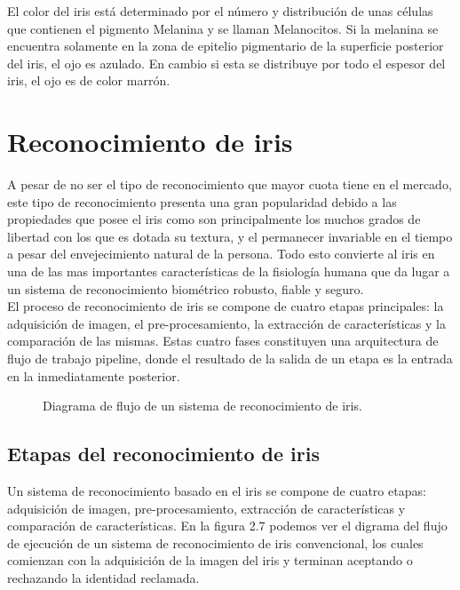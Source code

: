 El color del iris está determinado por el número y distribución de unas células que contienen el pigmento Melanina y se llaman Melanocitos. Si la melanina se encuentra solamente en la zona de epitelio pigmentario de la superficie posterior del iris, el ojo es azulado. En cambio si esta se distribuye por todo el espesor del iris, el ojo es de color marrón. \\




\section{Reconocimiento de iris}

A pesar de no ser el tipo de reconocimiento que mayor cuota tiene en el mercado, este tipo de reconocimiento presenta una gran popularidad debido a las propiedades que posee el iris como son principalmente los muchos grados de libertad con los que es dotada su textura, y el permanecer invariable en el tiempo a pesar del envejecimiento natural de la persona. Todo esto convierte al iris en una de las mas importantes características de la fisiología humana que da lugar a un sistema de reconocimiento biométrico robusto, fiable y seguro. \\

El proceso de reconocimiento de iris se compone de cuatro etapas principales: la adquisición de imagen, el pre-procesamiento, la  extracción de características y la comparación de las mismas. Estas cuatro fases constituyen una arquitectura de flujo de trabajo pipeline, donde el resultado de la salida de un etapa es la entrada en la inmediatamente posterior.\\

\begin{figure}[htbp]
\centering
{}
\caption{Diagrama de flujo de un sistema de reconocimiento de iris.} \label{fig:señales}
\end{figure}


\subsection{Etapas del reconocimiento de iris}

Un sistema de reconocimiento basado en el iris se compone de cuatro etapas: adquisición de imagen, pre-procesamiento, extracción de características y comparación de características. En la figura 2.7 podemos ver el digrama del flujo de ejecución de un sistema de reconocimiento de iris convencional, los cuales comienzan con la adquisición de la imagen del iris y terminan aceptando o rechazando la identidad reclamada. \\

